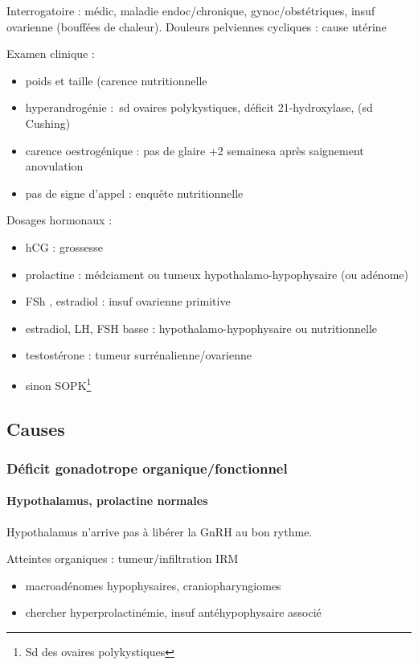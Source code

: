 \documentclass[11pt]{article}
\begin{document}
Interrogatoire : médic, maladie endoc/chronique,
gynoc/obstétriques, insuf ovarienne (bouffées de chaleur). Douleurs pelviennes
cycliques : cause utérine

Examen clinique : 
\begin{itemize}
\item poids et taille (carence nutritionnelle
\item hyperandrogénie : sd ovaires polykystiques, déficit 21-hydroxylase, (sd
Cushing)
\item carence oestrogénique : pas de glaire +2 semainesa après saignement \thus
anovulation
\item pas de signe d'appel : enquête nutritionnelle
\end{itemize}

Dosages hormonaux :
\begin{itemize}
\item hCG : grossesse
\item prolactine \inc : médciament ou tumeux hypothalamo-hypophysaire (ou adénome)
\item FSh \inc, estradiol \dec : insuf ovarienne primitive
\item estradiol, LH, FSH basse : hypothalamo-hypophysaire ou nutritionnelle
\item testostérone : tumeur surrénalienne/ovarienne
\item sinon SOPK\footnote{Sd des ovaires polykystiques}
\end{itemize}

\subsection{Causes}
\label{sec:org9e78234}

\subsubsection{Déficit gonadotrope organique/fonctionnel}
\label{sec:org09ad80d}

\paragraph{Hypothalamus, prolactine normales}
\label{sec:org214acbb}
Hypothalamus n'arrive pas à libérer la GnRH au bon rythme. 

Atteintes organiques : tumeur/infiltration \thus IRM
\begin{itemize}
\item macroadénomes hypophysaires, craniopharyngiomes
\item chercher hyperprolactinémie, insuf antéhypophysaire associé
\end{itemize}
\end{document}

